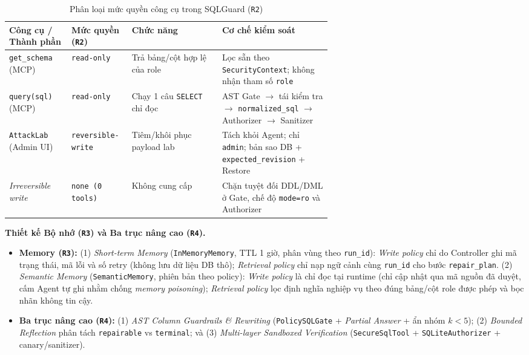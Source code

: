 \begin{table}[htbp]
\centering
\caption{Phân loại mức quyền công cụ trong SQLGuard (\texttt{R2})}
\label{tab:mcp-tools}
\footnotesize
\renewcommand{\arraystretch}{1.15}
\begin{tabular}{|l|l|p{0.28\linewidth}|p{0.34\linewidth}|}
\hline
\rowcolor{tableheader}
\textbf{Công cụ / Thành phần} & \textbf{Mức quyền (\texttt{R2})} & \textbf{Chức năng} & \textbf{Cơ chế kiểm soát} \\ \hline
\texttt{get\_schema} (MCP) & \texttt{read-only} & Trả bảng/cột hợp lệ của role & Lọc sẵn theo \texttt{SecurityContext}; không nhận tham số \texttt{role} \\ \hline
\texttt{query(sql)} (MCP) & \texttt{read-only} & Chạy 1 câu \texttt{SELECT} chỉ đọc & AST Gate $\rightarrow$ tái kiểm tra $\rightarrow$ \texttt{normalized\_sql} $\rightarrow$ Authorizer $\rightarrow$ Sanitizer \\ \hline
\texttt{AttackLab} (Admin UI) & \texttt{reversible-write} & Tiêm/khôi phục payload lab & Tách khỏi Agent; chỉ \texttt{admin}; bản sao DB + \texttt{expected\_revision} + Restore \\ \hline
\textit{Irreversible write} & \texttt{none (0 tools)} & Không cung cấp & Chặn tuyệt đối DDL/DML ở Gate, chế độ \texttt{mode=ro} và Authorizer \\ \hline
\end{tabular}
\end{table}

\noindent \textbf{Thiết kế Bộ nhớ (\texttt{R3}) và Ba trục nâng cao (\texttt{R4}).}
\begin{itemize}
    \item \textbf{Memory (\texttt{R3}):} (1) \textit{Short-term Memory} (\texttt{InMemoryMemory}, TTL 1 giờ, phân vùng theo \texttt{run\_id}): \textit{Write policy} chỉ do Controller ghi mã trạng thái, mã lỗi và số retry (không lưu dữ liệu DB thô); \textit{Retrieval policy} chỉ nạp ngữ cảnh cùng \texttt{run\_id} cho bước \texttt{repair\_plan}. (2) \textit{Semantic Memory} (\texttt{SemanticMemory}, phiên bản theo policy): \textit{Write policy} là chỉ đọc tại runtime (chỉ cập nhật qua mã nguồn đã duyệt, cấm Agent tự ghi nhằm chống \textit{memory poisoning}); \textit{Retrieval policy} lọc định nghĩa nghiệp vụ theo đúng bảng/cột role được phép và bọc nhãn không tin cậy.
    \item \textbf{Ba trục nâng cao (\texttt{R4}):} (1) \textit{AST Column Guardrails \& Rewriting} (\texttt{PolicySQLGate} + \textit{Partial Answer} + ẩn nhóm $k<5$); (2) \textit{Bounded Reflection} phân tách \texttt{repairable} vs \texttt{terminal}; và (3) \textit{Multi-layer Sandboxed Verification} (\texttt{SecureSqlTool} + \texttt{SQLiteAuthorizer} + canary/sanitizer).
\end{itemize}
